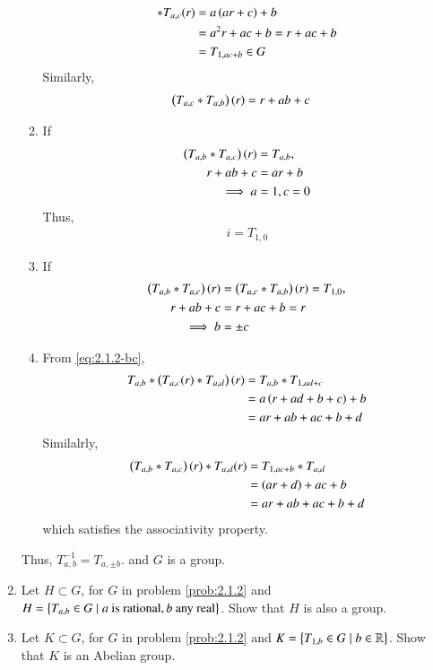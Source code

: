 \begin{enumerate}[label=\arabic*.,ref=\thesubsection.\theenumi]
\begin{enumerate}
\begin{align}
{*
			T_{a,c}}(r) &= a\left(ar+c\right)+b
			\\
			&=a^2r + ac+b = r+ac+b
			\\
			&=T_{1,ac+b} \in G
			\label{eq:2.1.2-bc}
		\end{align}
		Similarly, 
		\begin{align}
			\left(T_{a,c}
*
			T_{a,b}\right)(r) 
			&=r+ab+c
		\end{align}
	\item 	If 
		\begin{align}
			\left(T_{a,b}
*
			T_{a,c}\right)(r) &= T_{a,b}, 
			\\
			r+ab+c &= ar+b
			\\ 
			\implies 
			a &= 1, c = 0
		\end{align}
		Thus, 
		\begin{align}
			i = T_{1,0}
		\end{align}
	\item 	If 
		\begin{align}
			\left(T_{a,b}
*
			T_{a,c}\right)(r) &= 
			\left(T_{a,c}
*
			T_{a,b}\right)(r) = T_{1,0},
			\\
		r+ab+c
			&=
		r+ac+b = r
		\\
			\implies  b &= \pm c
		\end{align}
	\item From 
		\label{prob:2.1.2}
			\eqref{eq:2.1.2-bc},
		\begin{align}
			T_{a,b}
*
			\left(
			T_{a,c}(r) 
*
			T_{a,d}\right)(r) 
		&= 
			T_{a,b}
*
			T_{1,ad+c}
			\\
			&=a\left(r+ad+b + c\right)+b 
			\\
			&= ar + ab+ac+b+d
		\end{align}
		Similalrly, 
		\begin{align}
			\left(
			T_{a,b}
*
			T_{a,c}\right)(r) 
*
			T_{a,d}(r) 
		&= 
			T_{1,ac+b}
*
			T_{a,d}
			\\
			&=\left(ar+ d\right)+ac+b 
			\\
			&= ar + ab+ac+b+d
		\end{align}
		which satisfies the associativity property.
\end{enumerate}
		Thus, $T^{-1}_{a,b} = T_{a,\pm b}$.
		and $G$ is a group.
	\item Let $H \subset G$, for $G$ in problem 
		\ref{prob:2.1.2} and $H = \left\{{T_{a,b} \in G \mid a \text{ is rational}, b \text{ any real}}\right\}$.  Show that $H$ is also a group.
	\item Let $K \subset G$, for $G$ in problem 
		\ref{prob:2.1.2} and $K = \left\{T_{1,b} \in G \mid  b \in \mathbb{R}\right\}$.  Show that $K$ is an Abelian group.

\end{enumerate}
